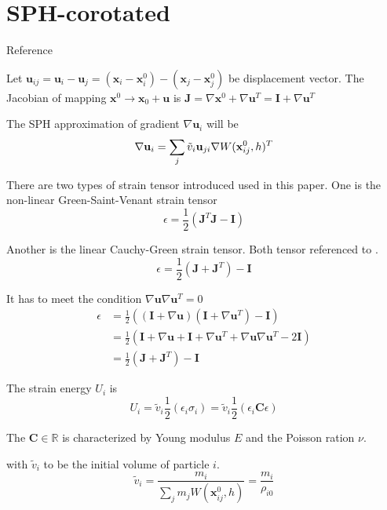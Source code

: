 \documentclass{article}
\newcommand{\xx}{\mathbf{x}}
\newcommand{\II}{\mathbf{I}}
\newcommand{\uu}{\mathbf{u}}
\newcommand{\CC}{\mathbf{C}}
\newcommand{\JJ}{\mathbf{J}}
\begin{document}
\section{SPH-corotated}

Reference \cite{becker:2009:sph-corotated}

Let $\uu_{ij}=\uu_i - \uu_j = (\xx_i - \xx_i^0) - (\xx_j - \xx_j^0) $ be displacement vector. The Jacobian of mapping $\xx^0 \rightarrow \xx_0 + \uu$ is $\JJ = \nabla \xx^0 + \nabla \uu^T = \II + \nabla \uu^T$

The SPH approximation of gradient $\nabla \uu_i$  will be
\begin{equation}
  \nabla \uu_i = \sum_j \tilde{v}_i \uu_{ji} \nabla W(\xx_{ij}^0 , h)^T \\
\end{equation}

There are two types of strain tensor introduced used in this paper. One is the non-linear Green-Saint-Venant strain tensor
\begin{equation}
\epsilon = \frac{1}{2} (\JJ^T \JJ - \II)
\end{equation}

Another is the linear Cauchy-Green strain tensor.  Both tensor referenced to \cite{bathe:2006:fep}. 
\begin{equation}
\epsilon  = \frac{1}{2} (\JJ + \JJ^T) - \II
\end{equation}

It has to meet the condition $\nabla \uu  \nabla \uu^T  = 0 $
\begin{align}
  \epsilon &= \frac{1}{2} ((\II + \nabla \uu) (\II + \nabla \uu^T) - \II ) \\
  &= \frac{1}{2} ( \II + \nabla \uu + \II + \nabla \uu^T + \nabla \uu  \nabla \uu^T  - 2\II) \\
  &= \frac{1}{2} (\JJ + \JJ^T) - \II
\end{align}

The strain energy $U_i$ is 
\begin{equation}
  U_i = \tilde{v}_i \frac{1}{2} (\epsilon_i \sigma_i) = \tilde{v}_i \frac{1}{2} (\epsilon_i \CC \epsilon)
\end{equation}

The $\CC \in \mathbb{R}$ is characterized by Young modulus $E$ and the Poisson ration $\nu$.

with $\tilde{v}_i$ to be the initial volume of particle $i$.
\begin{equation}
\tilde{v}_i = \frac{m_i}{\sum_j m_j W(\xx_{ij}^0,h)} = \frac{m_i}{\rho_{i0}}
\end{equation}
\end{document}
